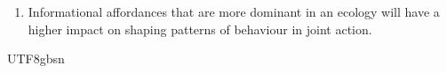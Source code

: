 \begin{CJK}{UTF8}{gbsn}
\begin{enumerate}
  \item Informational affordances that are more dominant in an ecology will have a higher impact on shaping patterns of behaviour in joint action.

\end{enumerate}














                                              \end{CJK}{UTF8}{gbsn}
